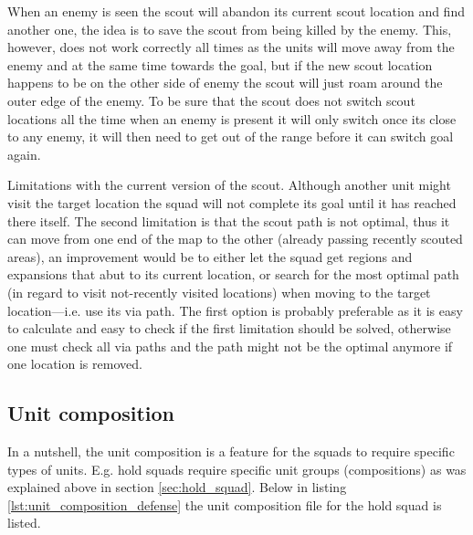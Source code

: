 When an enemy is seen the scout will abandon its current scout location and find another one, the idea is to save the scout from being killed by the enemy. This, however, does not work correctly all times as the units will move away from the enemy and at the same time towards the goal, but if the new scout location happens to be on the other side of enemy the scout will just roam around the outer edge of the enemy. To be sure that the scout does not switch scout locations all the time when an enemy is present it will only switch once its close to any enemy, it will then need to get out of the range before it can switch goal again.

Limitations with the current version of the scout. Although another unit might visit the target location the squad will not complete its goal until it has reached there itself. The second limitation is that the scout path is not optimal, thus it can move from one end of the map to the other (already passing recently scouted areas), an improvement would be to either let the squad get regions and expansions that abut to its current location, or search for the most optimal path (in regard to visit not-recently visited locations) when moving to the target location—i.e. use its via path. The first option is probably preferable as it is easy to calculate and easy to check if the first limitation should be solved, otherwise one must check all via paths and the path might not be the optimal anymore if one location is removed.

\subsection{Unit composition}
\label{sec:unit_composition}
In a nutshell, the unit composition is a feature for the squads to require specific types of units. E.g. hold squads require specific unit groups (compositions) as was explained above in section \ref{sec:hold_squad}. Below in listing \ref{lst:unit_composition_defense} the unit composition file for the hold squad is listed.

